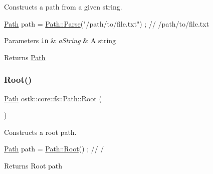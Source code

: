 Constructs a path from a given string. 


\begin{DoxyCode}
\hyperlink{classostk_1_1core_1_1fs_1_1_path_a1a5fff28594542489223b4cfad6cc9fb}{Path} path = \hyperlink{classostk_1_1core_1_1fs_1_1_path_ad08539ba654f5df11c4bcb07276345ad}{Path::Parse}(\textcolor{stringliteral}{"/path/to/file.txt"}) ; \textcolor{comment}{// /path/to/file.txt}
\end{DoxyCode}



\begin{DoxyParams}[1]{Parameters}
\mbox{\tt in}  & {\em a\+String} & A string \\
\hline
\end{DoxyParams}
\begin{DoxyReturn}{Returns}
\hyperlink{classostk_1_1core_1_1fs_1_1_path}{Path} 
\end{DoxyReturn}
\mbox{\label{classostk_1_1core_1_1fs_1_1_path_a79d34bce7de624ac851c29e59361a8e1}} 
\subsubsection{\texorpdfstring{Root()}{Root()}}
{\footnotesize\ttfamily \hyperlink{classostk_1_1core_1_1fs_1_1_path}{Path} ostk\+::core\+::fs\+::\+Path\+::\+Root (\begin{DoxyParamCaption}{ }\end{DoxyParamCaption})\hspace{0.3cm}{\ttfamily [static]}}



Constructs a root path. 


\begin{DoxyCode}
\hyperlink{classostk_1_1core_1_1fs_1_1_path_a1a5fff28594542489223b4cfad6cc9fb}{Path} path = \hyperlink{classostk_1_1core_1_1fs_1_1_path_a79d34bce7de624ac851c29e59361a8e1}{Path::Root}() ; \textcolor{comment}{// /}
\end{DoxyCode}


\begin{DoxyReturn}{Returns}
Root path 
\end{DoxyReturn}
\mbox{\label{classostk_1_1core_1_1fs_1_1_path_a344d49d5962f0cdd908d898ed329224f}} 
